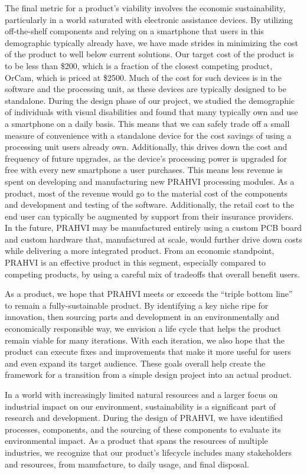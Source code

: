 	The final metric for a product’s viability involves the economic sustainability, particularly in a world saturated with electronic assistance devices. By utilizing off-the-shelf components and relying on a smartphone that users in this demographic typically already have, we have made strides in minimizing the cost of the product to well below current solutions. Our target cost of the product is to be less than \$200, which is a fraction of the closest competing product, OrCam, which is priced at \$2500. Much of the cost for such devices is in the software and the processing unit, as these devices are typically designed to be standalone. During the design phase of our project, we studied the demographic of individuals with visual disabilities and found that many typically own and use a smartphone on a daily basis. This means that we can safely trade off a small measure of convenience with a standalone device for the cost savings of using a processing unit users already own. Additionally, this drives down the cost and frequency of future upgrades, as the device’s processing power is upgraded for free with every new smartphone a user purchases. This means less revenue is spent on developing and manufacturing new PRAHVI processing modules. As a product, most of the revenue would go to the material cost of the components and development and testing of the software. Additionally, the retail cost to the end user can typically be augmented by support from their insurance providers. In the future, PRAHVI may be manufactured entirely using a custom PCB board and custom hardware that, manufactured at scale, would further drive down costs while delivering a more integrated product. From an economic standpoint, PRAHVI is an effective product in this segment, especially compared to competing products, by using a careful mix of tradeoffs that overall benefit users.
	
	As a product, we hope that PRAHVI meets or exceeds the “triple bottom line” to remain a fully-sustainable product. By identifying a key niche ripe for innovation, then sourcing parts and development in an environmentally and economically responsible way, we envision a life cycle that helps the product remain viable for many iterations. With each iteration, we also hope that the product can execute fixes and improvements that make it more useful for users and even expand its target audience. These goals overall help create the framework for a transition from a simple design project into an actual product.
	
	In a world with increasingly limited natural resources and a larger focus on industrial impact on our environment, sustainability is a significant part of research and development. During the design of PRAHVI, we have identified processes, components, and the sourcing of these components to evaluate its environmental impact. As a product that spans the resources of multiple industries, we recognize that our product’s lifecycle includes many stakeholders and resources, from manufacture, to daily usage, and final disposal.
	
